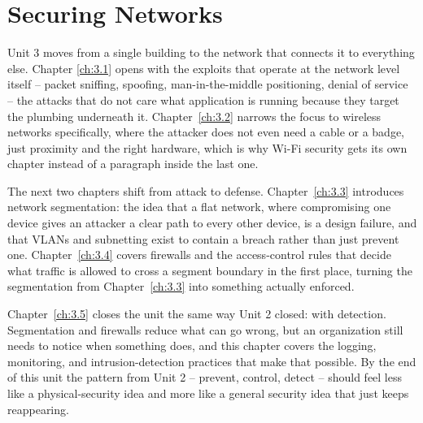 \part{Securing Networks}

Unit 3 moves from a single building to the network that connects it to everything else. Chapter
\ref{ch:3.1} opens with the exploits that operate at the network level itself -- packet sniffing,
spoofing, man-in-the-middle positioning, denial of service -- the attacks that do not care what
application is running because they target the plumbing underneath it. Chapter~\ref{ch:3.2}
narrows the focus to wireless networks specifically, where the attacker does not even need a
cable or a badge, just proximity and the right hardware, which is why Wi-Fi security gets its own
chapter instead of a paragraph inside the last one.

The next two chapters shift from attack to defense. Chapter~\ref{ch:3.3} introduces network
segmentation: the idea that a flat network, where compromising one device gives an attacker a
clear path to every other device, is a design failure, and that VLANs and subnetting exist to
contain a breach rather than just prevent one. Chapter~\ref{ch:3.4} covers firewalls and the
access-control rules that decide what traffic is allowed to cross a segment boundary in the first
place, turning the segmentation from Chapter~\ref{ch:3.3} into something actually enforced.

Chapter~\ref{ch:3.5} closes the unit the same way Unit 2 closed: with detection. Segmentation and
firewalls reduce what can go wrong, but an organization still needs to notice when something does,
and this chapter covers the logging, monitoring, and intrusion-detection practices that make that
possible. By the end of this unit the pattern from Unit 2 -- prevent, control, detect -- should
feel less like a physical-security idea and more like a general security idea that just keeps
reappearing.
